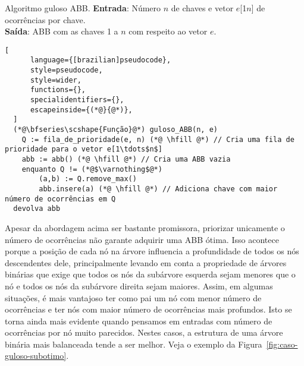 \begin{programruledcaption}{Algoritmo guloso ABB.\label{prog:abb-gulosa}}
  \noindent\textbf{Entrada}: Número $n$ de chaves e vetor $e$[1\tdots$n$] de ocorrências por chave. \\
  \textbf{Saída}: ABB com as chaves 1 a $n$ com respeito ao vetor $e$.
  \vspace{-0.5\baselineskip}
  \begin{lstlisting}[
      language={[brazilian]pseudocode},
      style=pseudocode,
      style=wider,
      functions={},
      specialidentifiers={},
      escapeinside={(*@}{@*)},
  ]
  (*@\bfseries\scshape{Função}@*) guloso_ABB(n, e)
    Q := fila_de_prioridade(e, n) (*@ \hfill @*) // Cria uma fila de prioridade para o vetor e[1\tdots$n$]
    abb := abb() (*@ \hfill @*) // Cria uma ABB vazia
    enquanto Q != (*@$\varnothing$@*) 
        (a,b) := Q.remove_max()
        abb.insere(a) (*@ \hfill @*) // Adiciona chave com maior número de ocorrências em Q
  devolva abb
  \end{lstlisting}
  \vspace{-0.5\baselineskip}
\end{programruledcaption}

Apesar da abordagem acima ser bastante promissora, priorizar unicamente o número de ocorrências não garante adquirir uma ABB ótima. Isso acontece porque a posição de cada nó na árvore influencia a profundidade de todos os nós descendentes dele, principalmente levando em conta a propriedade de árvores binárias que exige que todos os nós da subárvore esquerda sejam menores que o nó e todos os nós da subárvore direita sejam maiores. Assim, em algumas situações, é mais vantajoso ter como pai um nó com menor número de ocorrências e ter nós com maior número de ocorrências mais profundos. Isto se torna ainda mais evidente quando pensamos em entradas com número de ocorrências por nó muito parecidos. Nestes casos, a estrutura de uma árvore binária mais balanceada tende a ser melhor. Veja o exemplo da Figura~\ref{fig:caso-guloso-subotimo}.



